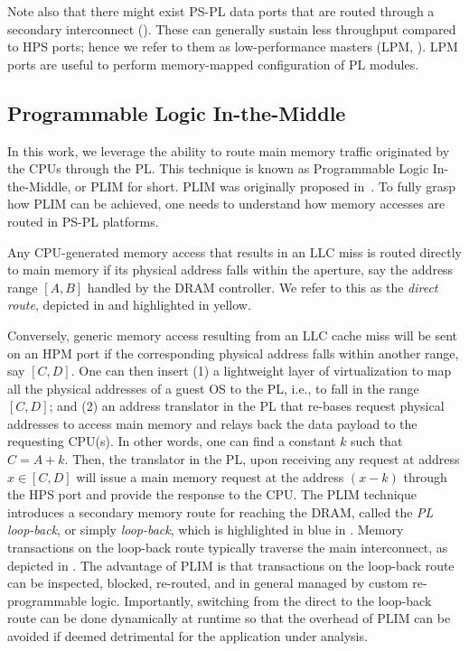 Note also that there might exist PS-PL data ports that are routed
through a secondary interconnect
(). These can generally sustain less
throughput compared to HPS ports; hence we refer to them as
low-performance masters (LPM, ). LPM
ports are useful to perform memory-mapped configuration of PL modules.

\subsection{Programmable Logic In-the-Middle}\label{sec:bg_plim}
In this work, we leverage the ability to route main memory traffic
originated by the CPUs through the PL. This technique is known as
Programmable Logic In-the-Middle, or PLIM for short. PLIM was
originally proposed in~\cite{PLIM20}. To fully grasp how PLIM can be
achieved, one needs to understand how memory accesses are routed in PS-PL platforms.

 Any CPU-generated memory access
that results in an LLC miss is routed directly to main memory if its
physical address falls within the aperture, say the address range
$[A,B]$ handled by the DRAM controller. We refer to this as the
\emph{direct route}, depicted in  and
highlighted in yellow.

Conversely, generic memory access resulting from an LLC cache miss
will be sent on an HPM port if the corresponding physical address
falls within another range, say $[C,D]$. One can then insert (1) a
lightweight layer of virtualization to map all the physical addresses
of a guest OS to the PL, i.e., to fall in the range $[C,D]$; and (2) an
address translator in the PL that re-bases request physical addresses
to access main memory and relays back the data payload to the
requesting CPU(s). In other words, one can find a constant $k$ such
that $C = A + k$. Then, the translator in the PL, upon receiving any
request at address $x \in [C, D]$ will issue a main memory request at
the address $(x - k)$ through the HPS port and provide the response to
the CPU.  The PLIM technique introduces a secondary memory route for
reaching the DRAM, called the \emph{PL loop-back}, or simply
\emph{loop-back}, which is highlighted in blue in
. Memory transactions on the
loop-back route typically traverse the main interconnect, as depicted
in . The advantage of PLIM is that
transactions on the loop-back route can be inspected, blocked,
re-routed, and in general managed by custom re-programmable
logic. Importantly, switching from the direct to the loop-back route
can be done dynamically at runtime so that the overhead of PLIM can be
avoided if deemed detrimental for the application under analysis.

